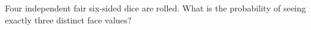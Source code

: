 Four independent fair six-sided dice are rolled. What is the probability of seeing exactly three distinct face values?

